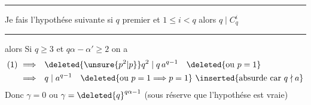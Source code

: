 \noindent\rule{\linewidth}{.35pt}\par
Je fais l'hypothése suivante \quad si $q$ premier et $1\leqslant i<q$ alors $q\mid C_q^i$
\par\noindent\rule{\linewidth}{.35pt}\par
alors Si $q\geqslant3$ et $q\alpha-\alpha'\geqslant2$  on a 
\[
\begin{aligned}
(1)\ \Longrightarrow\quad &\deleted{\unsure{p^{2}|p}}q^2\mid q\,a^{q-1}\quad\deleted{\text{ou }p=1}\\
\Longrightarrow\quad&q\mid a^{q-1}\quad\deleted{\text{ou }p=1\Longrightarrow p=1}\ \inserted{\text{absurde car }q\nmid a}
\end{aligned}
\]
Donc $\gamma=0$ ou $\gamma={\deleted{q}}^{q\alpha-1}$ (sous réserve que l'hypothése est vraie)%

